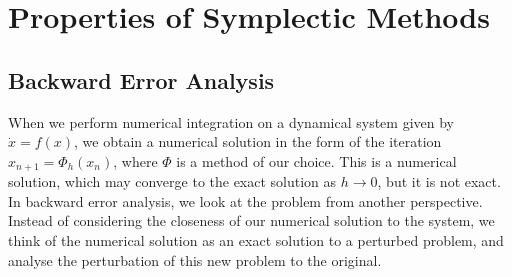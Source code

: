 \documentclass{report}
\theoremstyle{exampstyle} \newtheorem{example}[theorem]{Example}
\theoremstyle{exampstyle} \newtheorem{remark}[theorem]{Remark}
\theoremstyle{exampstyle} \newtheorem{definition}[theorem]{Definition}
\theoremstyle{exampstyle} \newtheorem{lemma}[theorem]{Lemma}
\begin{document}
\section{Properties of Symplectic Methods}

\subsection{Backward Error Analysis}

When we perform numerical integration on a dynamical system given by $\dot{x} = f(x)$,
we obtain a numerical solution in the form of the iteration $x_{n+1} = \Phi_h(x_n)$,
where $\Phi$ is a method of our choice.
This is a numerical solution, which may converge to the exact solution as $h \rightarrow 0$,
but it is not exact.
In backward error analysis, we look at the problem from another perspective.
Instead of considering the closeness of our numerical solution to the system,
we think of the numerical solution as an exact solution to a perturbed problem,
and analyse the perturbation of this new problem to the original.
\end{document}

